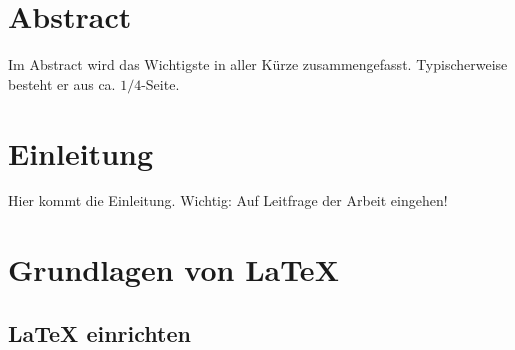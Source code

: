 \documentclass[a4paper,12pt,twoside]{article}
\begin{document}


\section*{Abstract}

Im Abstract wird das Wichtigste in aller Kürze zusammengefasst. Typischerweise besteht er aus ca. $1/4$-Seite.



\newpage
\tableofcontents

\parindent=0pt
\parskip=6pt

\newpage



\section{Einleitung}

Hier kommt die Einleitung. Wichtig: Auf Leitfrage der Arbeit eingehen!


\newpage
\section{Grundlagen von LaTeX}


\subsection{LaTeX einrichten}
\end{document}
